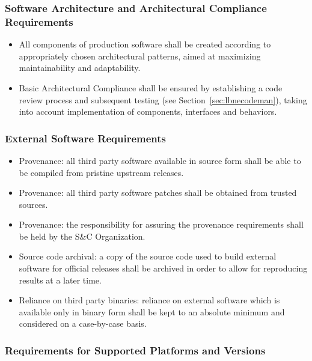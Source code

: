 \subsubsection{Software Architecture and Architectural Compliance Requirements}

\begin{itemize}

\item All components of production software shall be created according to appropriately chosen architectural patterns, aimed at maximizing maintainability and adaptability.

\item Basic Architectural Compliance shall be ensured by establishing a code review process and subsequent testing (see Section~\ref{sec:lbnecodeman}), taking into account implementation of components, interfaces and behaviors.

\end{itemize}

\subsubsection{External Software Requirements}
\begin{itemize}
\item Provenance: all third party software available in source form shall be able to be compiled from pristine upstream releases.

\item Provenance: all third party software patches shall be obtained from trusted sources.

\item Provenance: the responsibility for assuring the provenance requirements shall be held by the S\&C Organization.

\item Source code archival: a copy of the source code used to build external software for official releases shall be archived in order to allow for reproducing results at a later time.

\item Reliance on third party binaries: reliance on external software which is available only in binary form shall be kept to an absolute minimum and considered on a case-by-case basis.

\end{itemize}


\subsubsection{Requirements for Supported Platforms and Versions}

